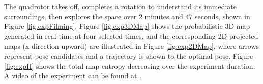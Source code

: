 The quadrotor takes off, completes a rotation to understand its immediate surroundings, then explores the space over $2$ minutes and $47$ seconds, shown in Figure \ref{fig:expFilming}. Figure \ref{fig:exp3DMap} shows the probabilistic 3D map generated in real-time at four selected times, and the corresponding 2D projected maps (x-direction upward) are illustrated in Figure \ref{fig:exp2DMap}, where arrows represent pose candidates and a trajectory is shown to the optimal pose. Figure \ref{fig:expH} shows the total map entropy decreasing over the experiment duration. A video of the experiment can be found at \href{https://www.youtube.com/watch?v=I_1rXV2XRqk}{}.


\begin{figure}[!t]
\end{figure}
